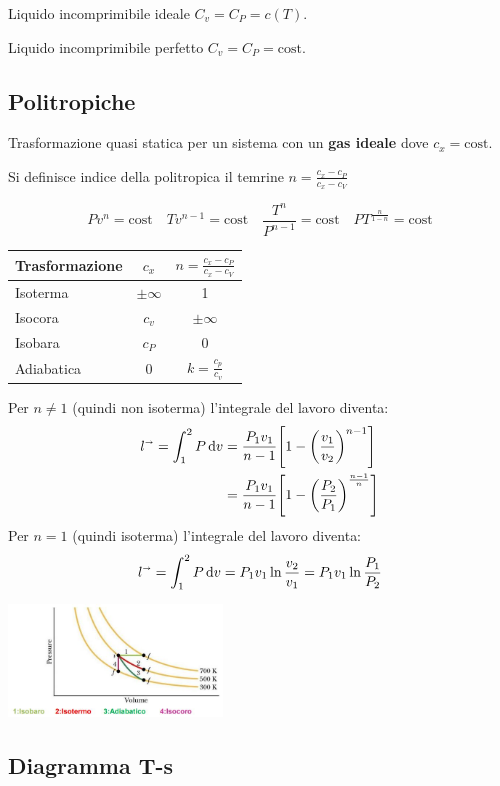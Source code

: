 Liquido incomprimibile ideale $C_v = C_P = c(T)$.

Liquido incomprimibile perfetto $C_v = C_P = \text{cost}$.

\subsection{Politropiche}
Trasformazione quasi statica per un sistema con un \textbf{gas ideale} dove $c_x = \text{cost}$.

Si definisce indice della politropica il temrine $n = \frac{c_x-c_P}{c_x-c_V}$

\[
    Pv^n = \text{cost} \quad Tv^{n-1} = \text{cost} \quad \frac{T^n}{P^{n-1}} = \text{cost} \quad PT^{\frac{n}{1-n}} = \text{cost}
\]

\begin{tabular}{lcc}
    \toprule
    Trasformazione & $c_x$ & $n = \frac{c_x-c_P}{c_x-c_V}$ \\
    \midrule
    Isoterma & $\pm\infty$ & 1 \\
    Isocora & $c_v$ & $\pm\infty$ \\
    Isobara & $c_P$ & 0 \\
    Adiabatica & 0 & $k = \frac{c_p}{c_v}$ \\
    \bottomrule
\end{tabular}

Per $n \ne 1$ (quindi non isoterma) l'integrale del lavoro diventa:
\begin{align*}
    l^\shortrightarrow = \int_1^2 P\dd{v} &= \frac{P_1v_1}{n-1} \qty[1-\qty(\frac{v_1}{v_2})^{n-1}] \\
    &= \frac{P_1v_1}{n-1} \qty[1-\qty(\frac{P_2}{P_1})^{\frac{n-1}{n}}]
\end{align*}
Per $n = 1$ (quindi isoterma) l'integrale del lavoro diventa:
\[ l^\shortrightarrow = \int_1^2 P\dd{v} = P_1v_1\ln{\frac{v_2}{v_1}} = P_1v_1\ln{\frac{P_1}{P_2}} \]

\begin{center}
    \includegraphics[height=3cm]{politropiche.JPG}
\end{center}

\subsection{Diagramma T-s}

